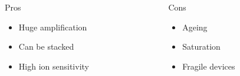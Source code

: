 \begin{frame}
  \begin{columns}
    \begin{column}{0.45\textwidth}
      \begin{block}{Pros}
        \begin{itemize}
          \item Huge amplification
          \item Can be stacked
          \item High ion sensitivity
        \end{itemize}
      \end{block}
    \end{column}
    \begin{column}{0.45\textwidth}
      \begin{block}{Cons}
        \begin{itemize}
          \item Ageing
          \item Saturation
          \item Fragile devices
        \end{itemize}
      \end{block}
    \end{column}
  \end{columns}
\end{frame}

